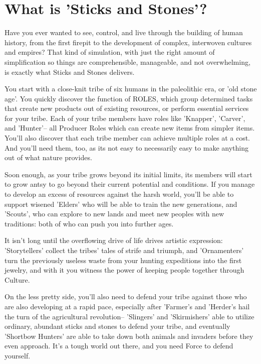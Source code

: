 \documentclass[11pt]{article}
\date{\today}
\title{}
\begin{document}
\tableofcontents

\section{What is 'Sticks and Stones'?}
\label{sec:orgbc2230c}
Have you ever wanted to see, control, and live through the building of human history, from the first firepit to the development of complex, interwoven cultures and empires? That kind of simulation, with just the right amount of simplification so things are comprehensible, manageable, and not overwhelming, is exactly what Sticks and Stones delivers. 

You start with a close-knit tribe of six humans in the paleolithic era, or 'old stone age'. You quickly discover the function of ROLES, which group determined tasks that create new products out of existing resources, or perform essential services for your tribe. Each of your tribe members have roles like 'Knapper', 'Carver', and 'Hunter'-- all Producer Roles which can create new items from simpler items. You'll also discover that each tribe member can achieve multiple roles at a cost. And you'll need them, too, as its not easy to necessarily easy to make anything out of what nature provides. 

Soon enough, as your tribe grows beyond its initial limits, its members will start to grow antsy to go beyond their current potential and conditions. If you manage to develop an excess of resources against the harsh world, you'll be able to support wisened 'Elders' who will be able to train the new generations, and 'Scouts', who can explore to new lands and meet new peoples with new traditions: both of who can push you into further ages.

It isn't long until the overflowing drive of life drives artistic expression: 'Storytellers' collect the tribes' tales of strife and triumph, and 'Ornamenters' turn the previously useless waste from your hunting expeditions into the first jewelry, and with it you witness the power of keeping people together through Culture. 

On the less pretty side, you'll also need to defend your tribe against those who are also developing at a rapid pace, especially after 'Farmer's and 'Herder's hail the turn of the agricultural revolution-- 'Slingers' and 'Skirmishers' able to utilize ordinary, abundant sticks and stones to defend your tribe, and eventually 'Shortbow Hunters' are able to take down both animals and invaders before they even approach. It's a tough world out there, and you need Force to defend yourself.
\end{document}
